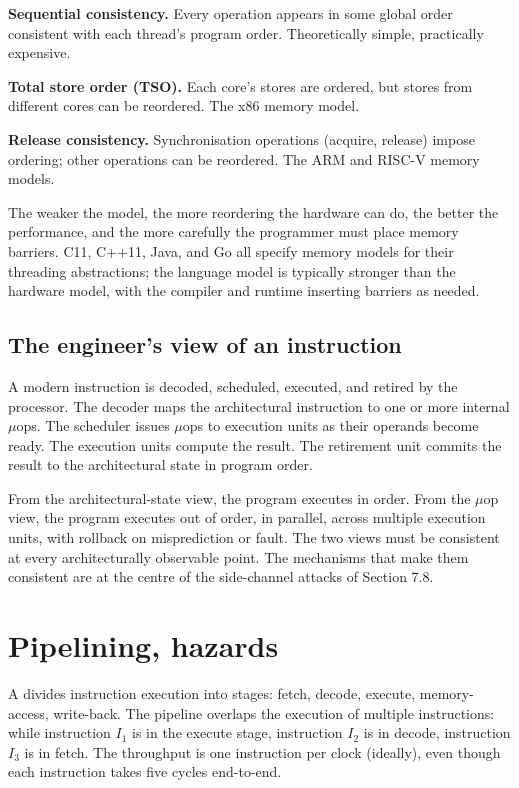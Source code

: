 \textbf{Sequential consistency.} Every operation appears in some global order consistent with each thread's program order. Theoretically simple, practically expensive.

\textbf{Total store order (TSO).} Each core's stores are ordered, but stores from different cores can be reordered. The x86 memory model.

\textbf{Release consistency.} Synchronisation operations (acquire, release) impose ordering; other operations can be reordered. The ARM and RISC-V memory models.

The weaker the model, the more reordering the hardware can do, the better the performance, and the more carefully the programmer must place memory barriers. C11, C++11, Java, and Go all specify memory models for their threading abstractions; the language model is typically stronger than the hardware model, with the compiler and runtime inserting barriers as needed.

\subsection{The engineer's view of an instruction}

A modern instruction is decoded, scheduled, executed, and retired by the processor. The decoder maps the architectural instruction to one or more internal $\mu$ops. The scheduler issues $\mu$ops to execution units as their operands become ready. The execution units compute the result. The retirement unit commits the result to the architectural state in program order.

From the architectural-state view, the program executes in order. From the $\mu$op view, the program executes out of order, in parallel, across multiple execution units, with rollback on misprediction or fault. The two views must be consistent at every architecturally observable point. The mechanisms that make them consistent are at the centre of the side-channel attacks of Section 7.8.

\section{Pipelining, hazards}

A  divides instruction execution into stages: fetch, decode, execute, memory-access, write-back. The pipeline overlaps the execution of multiple instructions: while instruction $I_1$ is in the execute stage, instruction $I_2$ is in decode, instruction $I_3$ is in fetch. The throughput is one instruction per clock (ideally), even though each instruction takes five cycles end-to-end.

